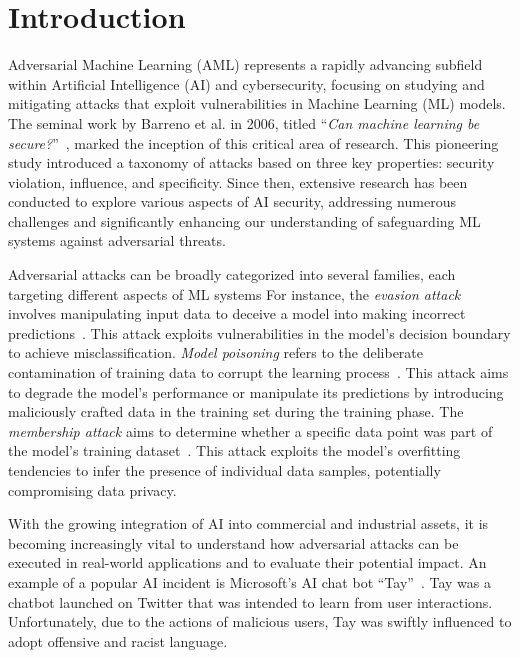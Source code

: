 \section{Introduction}

Adversarial Machine Learning (AML) represents a rapidly advancing subfield within Artificial Intelligence (AI) and cybersecurity, focusing on studying and mitigating attacks that exploit vulnerabilities in Machine Learning (ML) models.
The seminal work by Barreno et al. in 2006, titled ``\textit{Can machine learning be secure?}''~\cite{barreno2006can}, marked the inception of this critical area of research.
This pioneering study introduced a taxonomy of attacks based on three key properties: security violation, influence, and specificity.
Since then, extensive research has been conducted to explore various aspects of AI security, addressing numerous challenges and significantly enhancing our understanding of safeguarding ML systems against adversarial threats.
\par
Adversarial attacks can be broadly categorized into several families, each targeting different aspects of ML systems
For instance, the \textit{evasion attack} involves manipulating input data to deceive a model into making incorrect predictions~\cite{biggio2013evasion}.
This attack exploits vulnerabilities in the model's decision boundary to achieve misclassification.
\textit{Model poisoning} refers to the deliberate contamination of training data to corrupt the learning process~\cite{biggio2012poisoning}.
This attack aims to degrade the model's performance or manipulate its predictions by introducing maliciously crafted data in the training set during the training phase.
The \textit{membership attack} aims to determine whether a specific data point was part of the model's training dataset~\cite{shokri2017membership}.
This attack exploits the model's overfitting tendencies to infer the presence of individual data samples, potentially compromising data privacy.
\par
With the growing integration of AI into commercial and industrial assets, it is becoming increasingly vital to understand how adversarial attacks can be executed in real-world applications and to evaluate their potential impact.
An example of a popular AI incident is Microsoft's AI chat bot ``Tay''~\cite{wolf2017why}. 
Tay was a chatbot launched on Twitter that was intended to learn from user interactions.
Unfortunately, due to the actions of malicious users, Tay was swiftly influenced to adopt offensive and racist language.
\par
